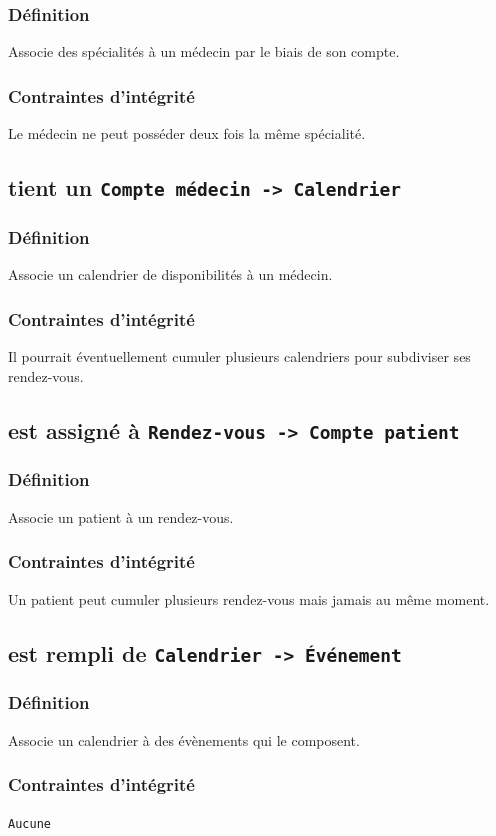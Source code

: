 \subsubsection{Définition}
Associe des spécialités à un médecin par le biais de son compte.
\subsubsection{Contraintes d'intégrité}
Le médecin ne peut posséder deux fois la même spécialité.

\subsection{tient un \texttt{Compte médecin -> Calendrier}}
\subsubsection{Définition}
Associe un calendrier de disponibilités à un médecin.
\subsubsection{Contraintes d'intégrité}
Il pourrait éventuellement cumuler plusieurs calendriers pour subdiviser ses
rendez-vous.

\subsection{est assigné à \texttt{Rendez-vous -> Compte patient}}
\subsubsection{Définition}
Associe un patient à un rendez-vous.
\subsubsection{Contraintes d'intégrité}
Un patient peut cumuler plusieurs rendez-vous mais jamais au même moment.

\subsection{est rempli de \texttt{Calendrier -> Événement}}
\subsubsection{Définition}
Associe un calendrier à des évènements qui le composent.
\subsubsection{Contraintes d'intégrité}
\texttt{Aucune}

